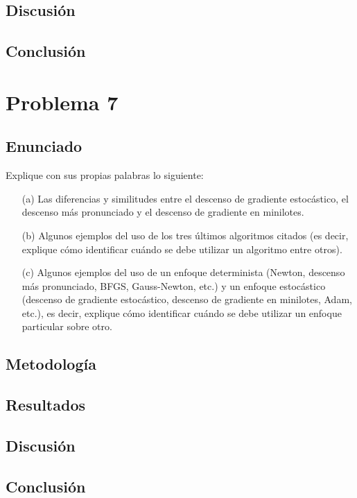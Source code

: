 \documentclass{article}
\begin{document}
\subsection{Discusión}

\subsection{Conclusión}

\section{Problema 7}

\subsection{Enunciado}

Explique con sus propias palabras lo siguiente:

\begin{itemize}
    \item[(a)] Las diferencias y similitudes entre el descenso de gradiente estocástico, el descenso más pronunciado y el descenso de gradiente en minilotes.
    \item[(b)] Algunos ejemplos del uso de los tres últimos algoritmos citados (es decir, explique cómo identificar cuándo se debe utilizar un algoritmo entre otros).
    \item[(c)] Algunos ejemplos del uso de un enfoque determinista (Newton, descenso más pronunciado, BFGS, Gauss-Newton, etc.) y un enfoque estocástico (descenso de gradiente estocástico, descenso de gradiente en minilotes, Adam, etc.), es decir, explique cómo identificar cuándo se debe utilizar un enfoque particular sobre otro.

\end{itemize}

\subsection{Metodología}

\subsection{Resultados}
\setcounter{equation}{0}

\subsection{Discusión}

\subsection{Conclusión}
\end{document}

